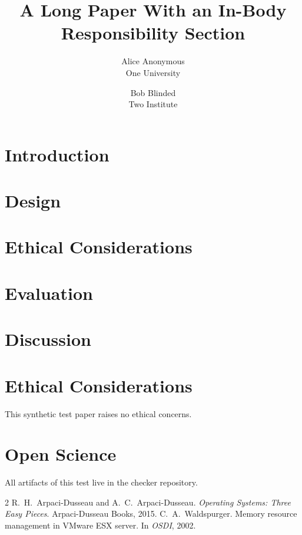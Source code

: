 \documentclass[letterpaper,twocolumn,10pt]{article}
\date{}
\title{\Large \bf A Long Paper With an In-Body Responsibility Section}
\author{{\rm Alice Anonymous}\\One University \and {\rm Bob Blinded}\\Two Institute}
\begin{document}
\maketitle

\begin{abstract}
\lipsum[1][1-5]
\end{abstract}

\section{Introduction}
\lipsum[1-35]

\section{Design}
\lipsum[36-70]

\section{Ethical Considerations}
\lipsum[71-80]

\section{Evaluation}
\lipsum[81-115]

\section{Discussion}
\lipsum[116-150]

\appendix
\section{Ethical Considerations}
This synthetic test paper raises no ethical concerns.

\section{Open Science}
All artifacts of this test live in the checker repository.

\begin{thebibliography}{2}
 R.~H.\ Arpaci-Dusseau and A.~C.\ Arpaci-Dusseau.
  \emph{Operating Systems: Three Easy Pieces}. Arpaci-Dusseau Books, 2015.
 C.~A.\ Waldspurger. Memory resource management in VMware ESX
  server. In \emph{OSDI}, 2002.
\end{thebibliography}
\end{document}
